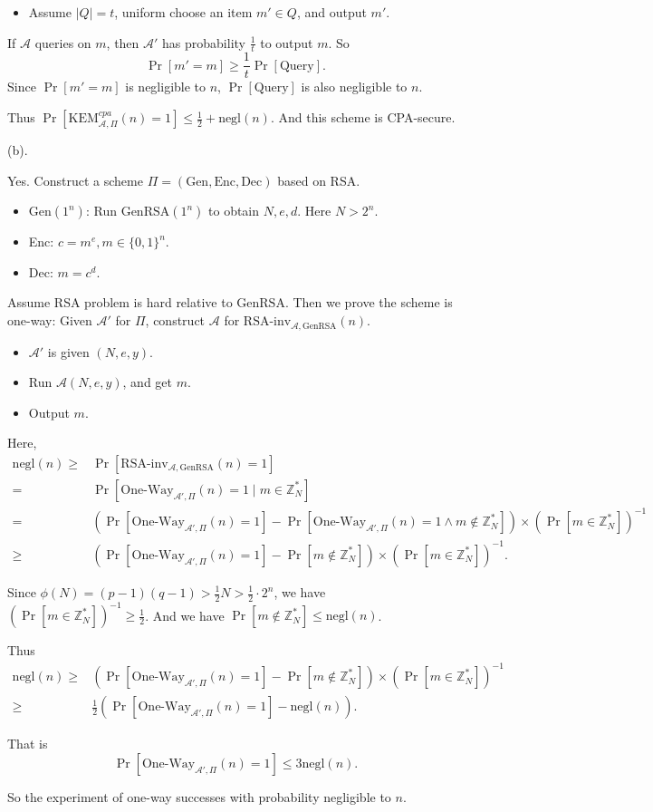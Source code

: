 \documentclass[a4paper]{article}
\newcommand{\negl}{\text{negl}}
\newcommand{\Enc}{\text{Enc}}
\newcommand{\GenRSA}{\text{GenRSA}}
\newcommand{\Dec}{\text{Dec}}
\newcommand{\Gen}{\text{Gen}}
\newcommand{\Query}{\text{Query}}
\newcommand{\KEM}{\text{KEM}}
\newcommand{\Z}{\mathbb{Z}}
\newcommand{\A}{\mathcal{A}}
\newenvironment{problem}[2][Problem]{\begin{trivlist}
\item[\hskip \labelsep {\bfseries #1}\hskip \labelsep {\bfseries #2.}]}{\end{trivlist}}
\begin{document}
\begin{problem}{11.3}
\begin{itemize}
    \item Assume $|Q|=t$, uniform choose an item $m'\in Q$, and output $m'$.
\end{itemize}
If $\A$ queries on $m$, then $\A'$ has probability $\frac1t$ to output $m$. 
So $$\Pr[m'=m]\ge \frac1t\Pr[\Query].$$
Since $\Pr[m'=m]$ is negligible to $n$, $\Pr[\Query]$ is also negligible to $n$.\par
Thus $\Pr[\KEM_{\A,\Pi}^{cpa}(n)=1]\le\frac12+\negl(n)$. And this scheme is CPA-secure.\par\vspace{2ex}
(b).\par
Yes. Construct a scheme $\Pi=(\Gen,\Enc,\Dec)$ based on RSA. 
\begin{itemize}
    \item $\Gen(1^n)$: Run $\GenRSA(1^n)$ to obtain $N,e,d$. Here $N>2^n$.
    \item Enc: $c=m^e,m\in\{0,1\}^n$.
    \item Dec: $m=c^d$.
\end{itemize}\par
Assume RSA problem is hard relative to $\GenRSA$. Then we prove the scheme is one-way: Given $\A'$ for $\Pi$, construct $\A$ for $\text{RSA-inv}_{\A,\GenRSA}(n)$.\par
\begin{itemize}
    \item $\A'$ is given $(N,e,y)$.
    \item Run $\A(N,e,y)$, and get $m$.
    \item Output $m$.
\end{itemize}\par
Here,
\begin{align*}
    \negl(n)\ge&\Pr[\text{RSA-inv}_{\A,\GenRSA}(n)=1]\\
    =&\Pr[\text{One-Way}_{\A',\Pi}(n)=1\mid m\in\Z_N^*]\\
    =&(\Pr[\text{One-Way}_{\A',\Pi}(n)=1]-\Pr[\text{One-Way}_{\A',\Pi}(n)=1\land m\not\in\Z_N^*])\times(\Pr[m\in \Z_N^*])^{-1}\\
    \ge&(\Pr[\text{One-Way}_{\A',\Pi}(n)=1]-\Pr[m\not\in\Z_N^*])\times(\Pr[m\in \Z_N^*])^{-1}.
\end{align*}\par
Since $\phi(N)=(p-1)(q-1)>\frac12N>\frac12\cdot 2^n$, we have $(\Pr[m\in \Z_N^*])^{-1}\ge\frac12$. And we have $\Pr[m\not\in \Z_N^*]\le\negl(n)$.\par
Thus 
\begin{align*}
    \negl(n)\ge&(\Pr[\text{One-Way}_{\A',\Pi}(n)=1]-\Pr[m\not\in\Z_N^*])\times(\Pr[m\in \Z_N^*])^{-1}\\
    \ge& \frac12(\Pr[\text{One-Way}_{\A',\Pi}(n)=1]-\negl(n)).
\end{align*}\par
That is $$\Pr[\text{One-Way}_{\A',\Pi}(n)=1]\le3\negl(n).$$\par
So the experiment of one-way successes with probability negligible to $n$.
\end{problem}
\end{document}
